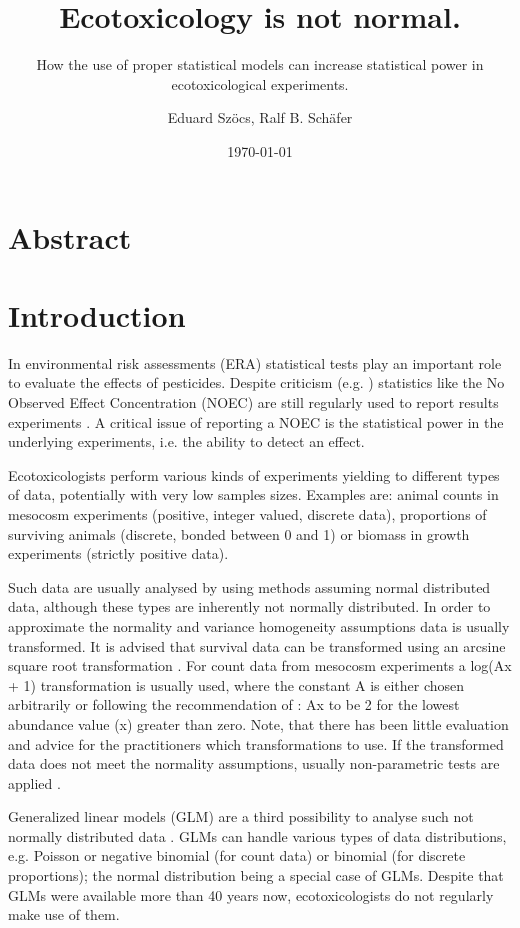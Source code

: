 \documentclass{scrartcl}
\title{Ecotoxicology is not normal.}
\subtitle{How the use of proper statistical models can increase statistical power in ecotoxicological experiments.}
\author{Eduard Szöcs, Ralf B. Schäfer}
\date{\today}
\begin{document}
\maketitle

\section*{Abstract}


\section{Introduction}
In environmental risk assessments (ERA) statistical tests play an important role to evaluate the effects of pesticides. 
Despite criticism (e.g. \citet{landis_well_2011}) statistics like the No Observed Effect Concentration (NOEC) are still regularly used to report results experiments \citep{jager_bad_2012}. 
A critical issue of reporting a NOEC is the statistical power in the underlying experiments, i.e. the ability to detect an effect.

Ecotoxicologists perform various kinds of experiments yielding to different types of data, potentially with very low samples sizes. 
Examples are: animal counts in mesocosm experiments (positive, integer valued, discrete data), proportions of surviving animals (discrete, bonded between 0 and 1) or biomass in growth experiments (strictly positive data).

Such data are usually analysed by using methods assuming normal distributed data, although these types are inherently not normally distributed. 
In order to approximate the normality and variance homogeneity assumptions data is usually transformed.
It is advised that survival data can be transformed using an arcsine square root transformation \citep{oecd_current_2006, newman_quantitative_2012}. 
For count data from mesocosm experiments a log(Ax + 1) transformation is usually used, where the constant A is either chosen arbitrarily or following the recommendation of \citet{van_den_brink_impact_2000}: Ax to be 2 for the lowest abundance value (x) greater than zero. 
Note, that there has been little evaluation and advice for the practitioners which transformations to use.
If the transformed data does not meet the normality assumptions, usually non-parametric tests are applied \citep{wang_making_2011}.

Generalized linear models (GLM) are a third possibility to analyse such not normally distributed data \citep{nelder_generalized_1972}.
GLMs can handle various types of data distributions, e.g. Poisson or negative binomial (for count data) or binomial (for discrete proportions); the normal distribution being a special case of GLMs.
Despite that GLMs were available more than 40 years now, ecotoxicologists do not regularly make use of them.
\end{document}
